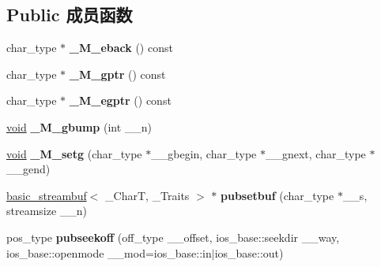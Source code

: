 \subsection*{Public 成员函数}
\begin{DoxyCompactItemize}
\item 
\mbox{\label{classbasic__streambuf_ae4b8684791655d71511e58a2e58d216d}} 
char\+\_\+type $\ast$ {\bfseries \+\_\+\+M\+\_\+eback} () const
\item 
\mbox{\label{classbasic__streambuf_ac3f9295be5aad8f94594c385f845aa80}} 
char\+\_\+type $\ast$ {\bfseries \+\_\+\+M\+\_\+gptr} () const
\item 
\mbox{\label{classbasic__streambuf_ac7de3ed825a3d15f4571332bc1d2f7ee}} 
char\+\_\+type $\ast$ {\bfseries \+\_\+\+M\+\_\+egptr} () const
\item 
\mbox{\label{classbasic__streambuf_a4115cb8df84e71b4aec9ed3e553496f0}} 
\hyperlink{interfacevoid}{void} {\bfseries \+\_\+\+M\+\_\+gbump} (int \+\_\+\+\_\+n)
\item 
\mbox{\label{classbasic__streambuf_ae39fa793da1566c745622d1897519205}} 
\hyperlink{interfacevoid}{void} {\bfseries \+\_\+\+M\+\_\+setg} (char\+\_\+type $\ast$\+\_\+\+\_\+gbegin, char\+\_\+type $\ast$\+\_\+\+\_\+gnext, char\+\_\+type $\ast$\+\_\+\+\_\+gend)
\item 
\mbox{\label{classbasic__streambuf_a0eeef489db67115e64d25c79563cbf9b}} 
\hyperlink{classbasic__streambuf}{basic\+\_\+streambuf}$<$ \+\_\+\+CharT, \+\_\+\+Traits $>$ $\ast$ {\bfseries pubsetbuf} (char\+\_\+type $\ast$\+\_\+\+\_\+s, streamsize \+\_\+\+\_\+n)
\item 
\mbox{\label{classbasic__streambuf_a6f631954d319f6b18a12926824b85399}} 
pos\+\_\+type {\bfseries pubseekoff} (off\+\_\+type \+\_\+\+\_\+offset, ios\+\_\+base\+::seekdir \+\_\+\+\_\+way, ios\+\_\+base\+::openmode \+\_\+\+\_\+mod=ios\+\_\+base\+::in$\vert$ios\+\_\+base\+::out)
\item 
\mbox{\label{classbasic__streambuf_ab3688bb63a81abef6743a7292742928e}} 

\end{DoxyCompactItemize}
